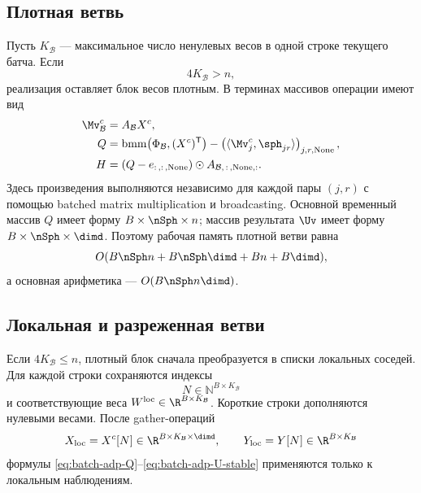\subsection{Плотная ветвь}

Пусть $K_{\mathcal B}$ --- максимальное число ненулевых весов в одной
строке текущего батча. Если
\begin{equation}
    4K_{\mathcal B}>n,
\label{eq:batch-adp-dense-dispatch}
\end{equation}
реализация оставляет блок весов плотным. В терминах массивов операции
имеют вид
\begin{align}
    \Mv_{\mathcal B}^c
    &=A_{\mathcal B}X^c,
    \\
    Q
    &=\operatorname{bmm}\!\left(
        \Phi_{\mathcal B},(X^c)^{\mathsf T}
      \right)
      -\left(
        \langle\Mv_j^c,\sph_{jr}\rangle
       \right)_{j,r,\mathrm{None}},
    \\
    H
    &=(Q-e_{:\,,:\,,\mathrm{None}})
      \odot A_{\mathcal B,\,:\,,\mathrm{None},:}.
\end{align}
Здесь произведения выполняются независимо для каждой пары
$(j,r)$ с помощью batched matrix multiplication и broadcasting.
Основной временный массив $Q$ имеет форму
$B\times\nSph\times n$; массив результата $\Uv$ имеет форму
$B\times\nSph\times\dimd$. Поэтому рабочая память плотной ветви равна
\begin{equation}
    O(B\nSph n+B\nSph\dimd+Bn+B\dimd),
\end{equation}
а основная арифметика ---
$O(B\nSph n\dimd)$.

\subsection{Локальная и разреженная ветви}

Если $4K_{\mathcal B}\leq n$, плотный блок сначала преобразуется в
списки локальных соседей. Для каждой строки сохраняются индексы
\begin{equation}
    N\in\mathbb N^{B\times K_{\mathcal B}}
\end{equation}
и соответствующие веса
$W^{\mathrm{loc}}\in\R^{B\times K_{\mathcal B}}$.
Короткие строки дополняются нулевыми весами. После gather-операций
\begin{equation}
    X_{\mathrm{loc}}=X^c[N]
    \in\R^{B\times K_{\mathcal B}\times\dimd},
    \qquad
    Y_{\mathrm{loc}}=Y[N]
    \in\R^{B\times K_{\mathcal B}}
\end{equation}
формулы \eqref{eq:batch-adp-Q}--\eqref{eq:batch-adp-U-stable}
применяются только к локальным наблюдениям.


